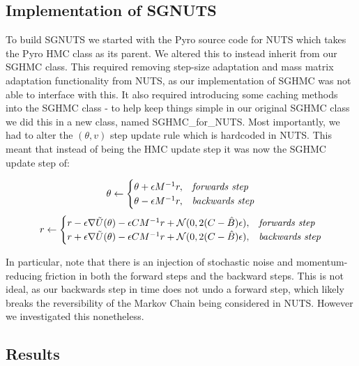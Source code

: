 \subsection{Implementation of SGNUTS}

To build SGNUTS we started with the Pyro source code for NUTS \cite{nuts_code} which takes the Pyro HMC class as its parent. We altered this to instead inherit from our SGHMC class. This required removing step-size adaptation and mass matrix adaptation functionality from NUTS, as our implementation of SGHMC was not able to interface with this. It also required introducing some caching methods into the SGHMC class - to help keep things simple in our original SGHMC class we did this in a new class, named SGHMC\_for\_NUTS. Most importantly, we had to alter the $(\theta,v)$ step update rule which is hardcoded in NUTS. This meant that instead of being the HMC update step it was now the SGHMC update step of:

$$
    \theta \leftarrow 
    \begin{cases}\theta + \epsilon M^{-1}r, & \text{{\textit{forwards step}}}\\
                \theta - \epsilon M^{-1}r,  & \text{{\textit{backwards step}}}

\end{cases}
$$
$$
    r \leftarrow 
    \begin{cases}
                
    r - \epsilon \nabla \tilde{U}(\theta) - \epsilon C M^{-1}r + \mathcal{N}(0,2(C-\hat{B})\epsilon), & \text{{\textit{forwards step}}}\\
   
    r + \epsilon \nabla \tilde{U}(\theta) - \epsilon C M^{-1}r + \mathcal{N}(0,2(C-\hat{B})\epsilon), & \text{{\textit{backwards step}}}\\
 \end{cases}
    $$

In particular, note that there is an injection of stochastic noise and momentum-reducing friction in both the forward steps and the backward steps. This is not ideal, as our backwards step in time does not undo a forward step, which likely breaks the reversibility of the Markov Chain being considered in NUTS. However we investigated this nonetheless.


\subsection{Results} 

